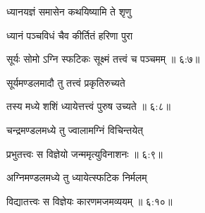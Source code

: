 {\devanagarifont ध्यानयज्ञं समासेन कथयिष्यामि ते शृणु \thinspace{\dandab} \dontdisplaylinenum }%

{\devanagarifont ध्यानं पञ्चविधं चैव कीर्तितं हरिणा पुरा  \danda\dontdisplaylinenum }%


{\devanagarifont सूर्यः सोमो ऽग्नि स्फटिकः सूक्ष्मं तत्त्वं च पञ्चमम् {॥ ६:७॥} \veg\dontdisplaylinenum }%

{\devanagarifont सूर्यमण्डलमादौ तु तत्त्वं प्रकृतिरुच्यते \thinspace{\dandab} \dontdisplaylinenum }%
 

{\devanagarifont तस्य मध्ये शशिं ध्यायेत्तत्त्वं पुरुष उच्यते {॥ ६:८॥} \veg\dontdisplaylinenum }%

{\devanagarifont चन्द्रमण्डलमध्ये तु ज्वालामग्निं विचिन्तयेत् \thinspace{\dandab} \dontdisplaylinenum }%


{\devanagarifont प्रभुतत्त्वः स विज्ञेयो जन्ममृत्युविनाशनः {॥ ६:९॥} \veg\dontdisplaylinenum }%

{\devanagarifont अग्निमण्डलमध्ये तु ध्यायेत्स्फटिक निर्मलम् \thinspace{\dandab} \dontdisplaylinenum }%


{\devanagarifont विद्यातत्त्वः स विज्ञेयः कारणमजमव्ययम् {॥ ६:१०॥} \veg\dontdisplaylinenum }%

